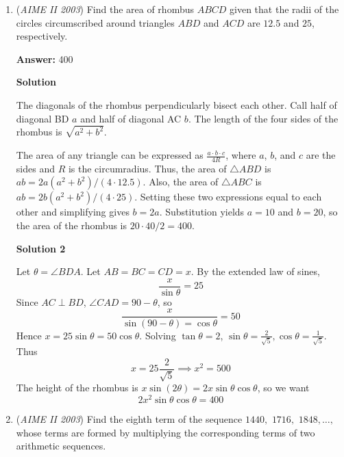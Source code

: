\begin{enumerate}
 Now, we show that the partitioning from the consecutive cuts of the two triangles results in twelve congruent triangles (three triangles formed by each line. Each line, $AB$, $A'B'$, so on so forth are parallel, forming transversals. Repeated parallel base theorems give the desired result.

 Exactly nine of these congruent triangles form the interior of the triangle $ABC$. Say these all have area $T$. Then, $9T = 84$ so $T = 28/3$. Then, multiplying by the 12 triangles, the answer is $28 \cdot 4 = \boxed{112}$.

 


	\item (\textit{AIME II 2003}) Find the area of rhombus $ABCD$ given that the radii of the circles circumscribed around triangles $ABD$ and $ACD$ are $12.5$ and $25$, respectively.


 
 \textbf{Answer: }400



\textbf{Solution}

The diagonals of the rhombus perpendicularly bisect each other. Call half of diagonal BD $a$ and half of diagonal AC $b$. The length of the four sides of the rhombus is $\sqrt{a^2+b^2}$. 

 The area of any triangle can be expressed as $\frac{a\cdot b\cdot c}{4R}$, where $a$, $b$, and $c$ are the sides and $R$ is the circumradius. Thus, the area of $\triangle ABD$ is $ab=2a(a^2+b^2)/(4\cdot12.5)$. Also, the area of $\triangle ABC$ is $ab=2b(a^2+b^2)/(4\cdot25)$. Setting these two expressions equal to each other and simplifying gives $b=2a$. Substitution yields $a=10$ and $b=20$, so the area of the rhombus is $20\cdot40/2=\boxed{400}$.

 



\textbf{Solution 2}

Let $\theta=\angle BDA$. Let $AB=BC=CD=x$. By the extended law of sines,
 \[\frac{x}{\sin\theta}=25\]Since $AC\perp BD$, $\angle CAD=90-\theta$, so
 \[\frac{x}{\sin(90-\theta)=\cos\theta}=50\]Hence $x=25\sin\theta=50\cos\theta$. Solving $\tan\theta=2$, $\sin\theta=\frac{2}{\sqrt{5}}, \cos\theta=\frac{1}{\sqrt{5}}$. Thus
 \[x=25\frac{2}{\sqrt{5}}\implies x^2=500\]The height of the rhombus is $x\sin(2\theta)=2x\sin\theta\cos\theta$, so we want
 \[2x^2\sin\theta\cos\theta=\boxed{400}\]



	\item (\textit{AIME II 2003}) Find the eighth term of the sequence $1440,$ $1716,$ $1848,\ldots,$ whose terms are formed by multiplying the corresponding terms of two arithmetic sequences.



\end{enumerate}
